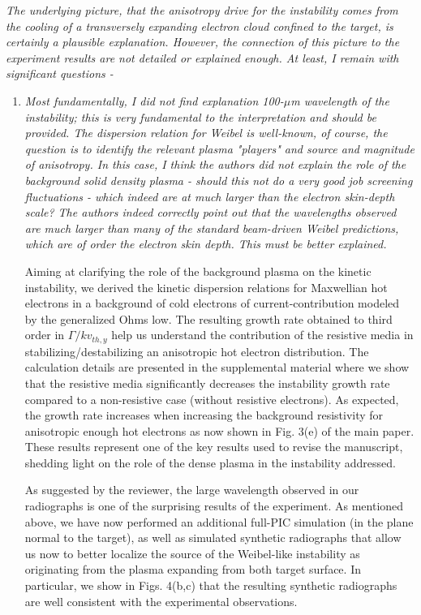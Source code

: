 \documentclass[aps,showpacs,superscriptaddress]{revtex4}%
\begin{document}
\textit{
The underlying picture, that the anisotropy drive for the instability comes from the cooling of a transversely expanding electron cloud confined to the target, is certainly a plausible explanation. However, the connection of this picture to the experiment results are not detailed or explained enough. At least, I remain with significant questions -}

\begin{enumerate}
\item \textit{Most fundamentally, I did not find explanation 100-$\mu$m wavelength of the instability; this is very fundamental to the interpretation and should be provided. The dispersion relation for Weibel is well-known, of course, the question is to identify the relevant plasma "players" and source and magnitude of anisotropy. In this case, I think the authors did not explain the role of the background solid density plasma - should this not do a very good job screening fluctuations - which indeed are at much larger than the electron skin-depth scale? The authors indeed correctly point out that the wavelengths observed are much larger than many of the standard beam-driven Weibel predictions, which are of order the electron skin depth. This must be better explained. }

Aiming at clarifying the role of the background plasma on the kinetic instability,
we derived the kinetic dispersion relations for Maxwellian hot electrons in a background of cold electrons of current-contribution modeled by the generalized Ohms low. 
The resulting growth rate obtained to third order in $\Gamma/k v_{th,y}$ help us understand the contribution of the resistive media in stabilizing/destabilizing an anisotropic hot electron distribution. 
The calculation details are presented in the supplemental material where we show that the
resistive media significantly decreases the instability growth rate compared to a non-resistive case (without resistive electrons).
As expected, the growth rate increases when increasing the background resistivity for anisotropic enough hot electrons as now shown in Fig. 3(e) of the main paper.
These results represent one of the key results used to  revise the manuscript,  shedding light on the role of the dense plasma in the instability addressed.

As suggested by the reviewer,   the large wavelength observed in our radiographs is one of the surprising results of the  experiment. As mentioned above, we have now performed an additional full-PIC simulation (in the plane normal to the target), as well as simulated synthetic radiographs that allow us now to better localize the source of the Weibel-like instability as originating from the plasma expanding from both target surface. In particular, we show in Figs. 4(b,c) that the resulting synthetic radiographs are well consistent with the experimental observations. 


\end{enumerate}
\end{document}
